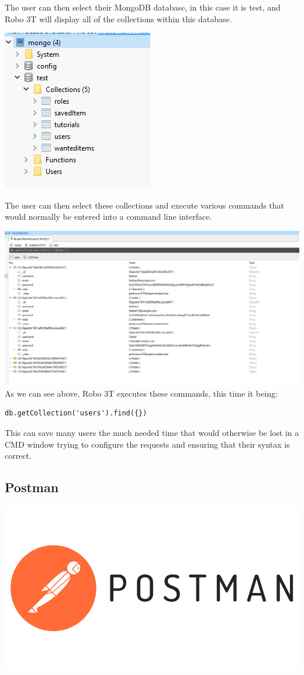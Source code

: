 The user can then select their MongoDB database, in this case it is test, and Robo 3T will display all of the collections within this database. \par
\includegraphics[]{img/robo-collections.PNG} \par
The user can then select these collections and execute various commands that would normally be entered into a command line interface. \par
\includegraphics[scale=0.4]{img/robo-users.PNG} \newline
As we can see above, Robo 3T executes these commands, this time it being: 
\begin{verbatim}
db.getCollection('users').find({})
\end{verbatim}
This can save many users the much needed time that would otherwise be lost in a CMD window trying to configure the requests and ensuring that their syntax is correct.


\subsection{Postman}
\includegraphics[scale=0.5]{img/postman-inc-logo-vector.png}
